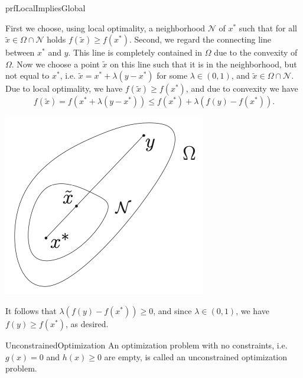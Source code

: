 \begin{prf}{prfLocalImpliesGlobal}
    \begin{minipage}{0.78\textwidth}
        First we choose, using local optimality, a neighborhood $\mathcal{N}$ of $x^*$ such that for all $\tilde{x} \in \Omega \cap \mathcal{N}$ holds $f(\tilde{x}) \geq f(x^*)$. Second, we regard the connecting line between $x^*$ and $y$. This line is completely contained in $\Omega$ due to the convexity of $\Omega$. Now we choose a point $\tilde{x}$ on this line such that it is in the neighborhood, but not equal to $x^*$, i\@.e\@. $\tilde{x} = x^* + \lambda(y - x^*)$ for some $\lambda \in (0,1)$, and $\tilde{x} \in \Omega \cap \mathcal{N}$. Due to local optimality, we have $f(\tilde{x}) \geq f(x^*)$, and due to convexity we have
        \begin{equation*}
            f(\tilde{x}) = f(x^* + \lambda(y - x^*)) \leq f(x^*) + \lambda(f(y) - f(x^*)).
        \end{equation*}
    \end{minipage}
    \begin{minipage}{0.2\textwidth}
        \includegraphics[scale = 0.6]{Images/Fundamental/ProofGlobalityLocal.png}
    \end{minipage}
    \vspace*{0.2cm}

    It follows that $\lambda(f(y) - f(x^*)) \geq 0$, and since $\lambda \in (0,1)$, we have $f(y) \geq f(x^*)$, as desired. 
\end{prf}

\begin{theo}{UnconstrainedOptimization}
    \vspace*{-0.2cm}
    An optimization problem with no constraints, i\@.e\@. $g(x) = 0$ and $h(x) \geq 0$ are empty, is called an unconstrained optimization problem. 
\end{theo}

